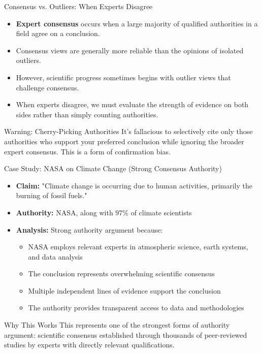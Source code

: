 \documentclass{beamer}
\begin{document}
\begin{frame}{Consensus vs. Outliers: When Experts Disagree}
    \begin{itemize}
        \item \textbf{Expert consensus} occurs when a large majority of qualified authorities in a field agree on a conclusion.
        \item Consensus views are generally more reliable than the opinions of isolated outliers.
        \item However, scientific progress sometimes begins with outlier views that challenge consensus.
        \item When experts disagree, we must evaluate the strength of evidence on both sides rather than simply counting authorities.
    \end{itemize}
    
    \begin{alertblock}{Warning: Cherry-Picking Authorities}
        It's fallacious to selectively cite only those authorities who support your preferred conclusion while ignoring the broader expert consensus. This is a form of confirmation bias.
    \end{alertblock}
\end{frame}

\begin{frame}{Case Study: NASA on Climate Change (Strong Consensus Authority)}
	\begin{itemize}
		\item \textbf{Claim:} "Climate change is occurring due to human activities, primarily the burning of fossil fuels."
		\item \textbf{Authority:} NASA, along with 97\% of climate scientists
		\item \textbf{Analysis:} Strong authority argument because:
		\begin{itemize}
			\item NASA employs relevant experts in atmospheric science, earth systems, and data analysis
			\item The conclusion represents overwhelming scientific consensus
			\item Multiple independent lines of evidence support the conclusion
			\item The authority provides transparent access to data and methodologies
		\end{itemize}
	\end{itemize}
	
	\begin{alertblock}{Why This Works}
		This represents one of the strongest forms of authority argument: scientific consensus established through thousands of peer-reviewed studies by experts with directly relevant qualifications.
	\end{alertblock}
\end{frame}
\end{document}
